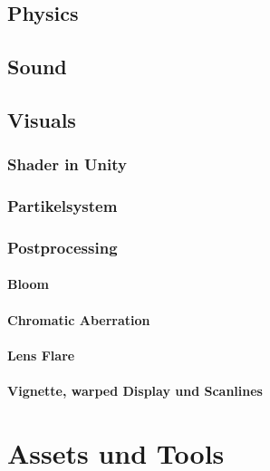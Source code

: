 \documentclass[a4paper,10pt,ngerman,fontsize=12pt]{scrreprt}
\begin{document}
\section{Physics}
\lipsum[3]



\section{Sound}
\lipsum[3]



\section{Visuals}
\lipsum[3]



\subsection{Shader in Unity}
\lipsum[3]


\subsection{Partikelsystem}
\lipsum[3]


\subsection{Postprocessing}
\lipsum[3]


\subsubsection{Bloom}
\lipsum[3]


\subsubsection{Chromatic Aberration}
\lipsum[3]


\subsubsection{Lens Flare}
\lipsum[3]


\subsubsection{Vignette, warped Display und Scanlines}
\lipsum[3]



\chapter{Assets und Tools}
\lipsum[3]
\end{document}
